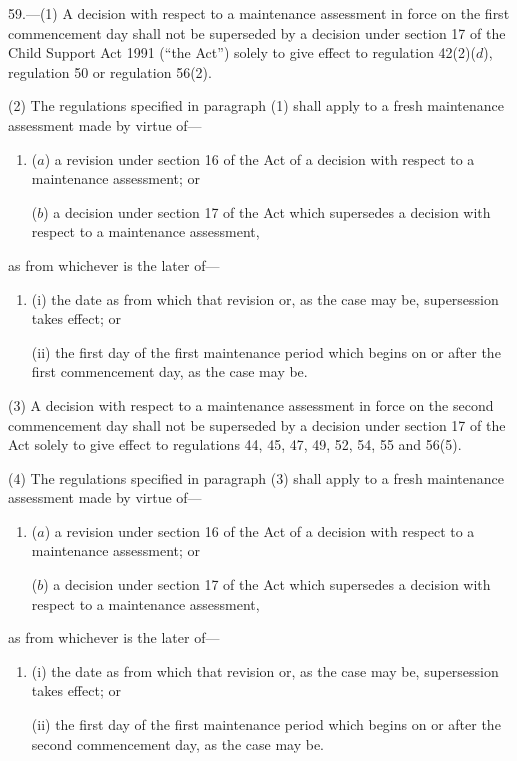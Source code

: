 \documentclass[12pt,a4paper]{article}
\begin{document}
59.—(1) A decision with respect to a maintenance assessment in force on the first commencement day shall not be superseded by a decision under section 17 of the Child Support Act 1991 (“the Act”) solely to give effect to regulation 42(2)($d$), regulation 50 or regulation 56(2).

(2) The regulations specified in paragraph (1) shall apply to a fresh maintenance assessment made by virtue of—
\begin{enumerate}\item[]
($a$) a revision under section 16 of the Act of a decision with respect to a maintenance assessment; or

($b$) a decision under section 17 of the Act which supersedes a decision with respect to a maintenance assessment,
\end{enumerate}
as from whichever is the later of—
\begin{enumerate}\item[]
(i) the date as from which that revision or, as the case may be, supersession takes effect; or

(ii) the first day of the first maintenance period which begins on or after the first commencement day, as the case may be.
\end{enumerate}

(3) A decision with respect to a maintenance assessment in force on the second commencement day shall not be superseded by a decision under section 17 of the Act solely to give effect to regulations 44, 45, 47, 49, 52, 54, 55 and 56(5).

(4) The regulations specified in paragraph (3) shall apply to a fresh maintenance assessment made by virtue of—
\begin{enumerate}\item[]
($a$) a revision under section 16 of the Act of a decision with respect to a maintenance assessment; or

($b$) a decision under section 17 of the Act which supersedes a decision with respect to a maintenance assessment,
\end{enumerate}
as from whichever is the later of—
\begin{enumerate}\item[]
(i) the date as from which that revision or, as the case may be, supersession takes effect; or

(ii) the first day of the first maintenance period which begins on or after the second commencement day, as the case may be.
\end{enumerate}
\end{document}
